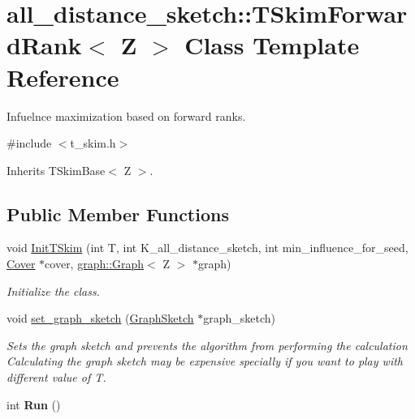 \hypertarget{classall__distance__sketch_1_1TSkimForwardRank}{}\section{all\+\_\+distance\+\_\+sketch\+:\+:T\+Skim\+Forward\+Rank$<$ Z $>$ Class Template Reference}
\label{classall__distance__sketch_1_1TSkimForwardRank}


Infuelnce maximization based on forward ranks.  




{\ttfamily \#include $<$t\+\_\+skim.\+h$>$}



Inherits T\+Skim\+Base$<$ Z $>$.

\subsection*{Public Member Functions}
\begin{DoxyCompactItemize}
\item 
void \hyperlink{classall__distance__sketch_1_1TSkimForwardRank_aa360ffd108fa094c74b27637712caae9}{Init\+T\+Skim} (int T, int K\+\_\+all\+\_\+distance\+\_\+sketch, int min\+\_\+influence\+\_\+for\+\_\+seed, \hyperlink{classall__distance__sketch_1_1Cover}{Cover} $\ast$cover, \hyperlink{classall__distance__sketch_1_1graph_1_1Graph}{graph\+::\+Graph}$<$ Z $>$ $\ast$graph)
\begin{DoxyCompactList}\small\item\em Initialize the class. \end{DoxyCompactList}\item 
\hypertarget{classall__distance__sketch_1_1TSkimForwardRank_af8661108000d31d53f986a159fe1f133}{}void \hyperlink{classall__distance__sketch_1_1TSkimForwardRank_af8661108000d31d53f986a159fe1f133}{set\+\_\+graph\+\_\+sketch} (\hyperlink{classall__distance__sketch_1_1GraphSketch}{Graph\+Sketch} $\ast$graph\+\_\+sketch)\label{classall__distance__sketch_1_1TSkimForwardRank_af8661108000d31d53f986a159fe1f133}

\begin{DoxyCompactList}\small\item\em Sets the graph sketch and prevents the algorithm from performing the calculation Calculating the graph sketch may be expensive specially if you want to play with different value of T. \end{DoxyCompactList}\item 
\hypertarget{classall__distance__sketch_1_1TSkimForwardRank_a6a93f3df6f811a2f1ad863075504be2c}{}int {\bfseries Run} ()\label{classall__distance__sketch_1_1TSkimForwardRank_a6a93f3df6f811a2f1ad863075504be2c}

\end{DoxyCompactItemize}


